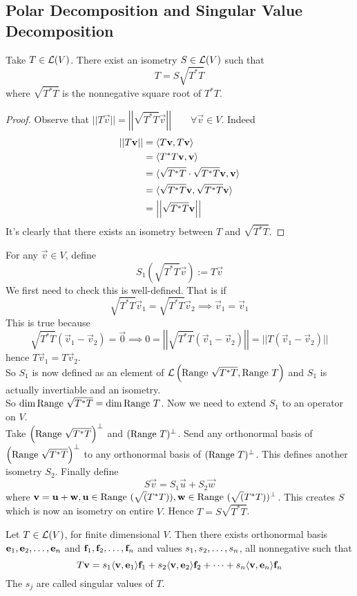 \subsection{Polar Decomposition and Singular Value Decomposition}
\begin{theorem}
	Take $T \in \mathcal L(V)$. There exist an isometry $S \in \mathcal L(V)$ such that
	\[ T = S \sqrt{T^*T}\]
	where $\sqrt{T^*T}$ is the nonnegative square root of $T^*T$.
\end{theorem}
\begin{proof}
	Observe that $||T\vec v || = \left|\left|\sqrt{T^*T} \vec v\right|\right| \qquad \forall \vec v \in V$. Indeed 
	\begin{align*}
		||T\mathbf v|| &= \langle T\mathbf v, T \mathbf v \rangle \\
		&= \langle T^*T \mathbf v, \mathbf v \rangle \\
		&= \langle \sqrt{T^*T} \cdot \sqrt{T^*T} \mathbf v, \mathbf v \rangle \\
		&= \langle \sqrt{T^*T} \mathbf v, \sqrt{T^*T} \mathbf v \rangle \\
		&= \left|\left| \sqrt{T^*T} \mathbf v \right|\right|
	\end{align*}
	It's clearly that there exists an isometry between $T$ and $\sqrt{T^*T}$.
\end{proof}
\begin{remark}[Construction of $S$]
	For any $\vec v \in V$, define
	\[ S_1\left( \sqrt{T^*T} \vec v\right) := T \vec v\]
	We first need to check this is well-defined. That is  if 
	\[ \sqrt{T^*T} \vec v_1 = \sqrt{T^*T} \vec v_2 \implies \vec v_1 = \vec v_1\]
	This is true because 
	\[ \sqrt{T^*T}(\vec v_1 - \vec v_2) = \vec 0 \implies 0 = \left|\left| \sqrt{T^*T} (\vec v_1 - \vec v_2)\right|\right| = ||T(\vec v_1 - \vec v_2)||\]
	hence $T\vec v_1 = T\vec v_2$. \\
	So $S_1$ is now defined as an element of $\mathcal L\left(\text{Range } \sqrt{T^*T}, \text{Range } T\right)$ and $S_1$ is actually invertiable and an isometry. \\
	So $\dim \text{Range } \sqrt{T^*T} = \dim \text{Range } T$. Now we need to extend $S_1$ to an operator on $V$. \\ 
	Take $\left(\text{Range } \sqrt{T^*T}\right)^\perp$ and $(\text{Range } T)^\perp$. Send any orthonormal basis of $\left(\text{Range } \sqrt{T^*T}\right)^\perp$ to any orthonormal basis of $(\text{Range } T)^\perp$. This defines another isometry $S_2$.
	Finally define  
	\[ S\vec v = S_1 \vec u + S_2 \vec w\] where $\mathbf v = \mathbf u + \mathbf w , \mathbf u \in \text{Range } (\sqrt(T^*T)), \mathbf w \in \text{Range } (\sqrt(T^*T))^\perp$. This creates $S$ which is now an isometry on entire $V$. Hence $T = S \sqrt{T^*T}$.
\end{remark}
\begin{theorem}
	Let $T \in \mathcal L(V)$, for finite dimensional $V$. Then there exists orthonormal basis ${\mathbf e}_1,{\mathbf e}_2, \ldots, {\mathbf e}_{n}$ and ${\mathbf f}_1,{\mathbf f}_2, \ldots, {\mathbf f}_{n}$ and values ${s}_1,{s}_2, \ldots, {s}_{n}$, all nonnegative such that 
	\[ T\mathbf v = s_1 \langle \mathbf v, \mathbf e_1 \rangle \mathbf f_1 + s_2 \langle \mathbf v, \mathbf e_2 \rangle \mathbf f_2 + \cdots + s_n \langle \mathbf v, \mathbf e_n \rangle \mathbf f_n\]
	The $s_j$ are called singular values of $T$.
\end{theorem}

